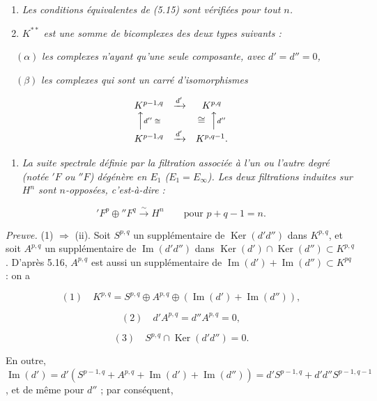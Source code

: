 \documentclass[
  french,
  a3paper,
  a3paper]{extarticle}
\providecommand{\tightlist}{%
  \setlength{\itemsep}{0pt}\setlength{\parskip}{0pt}}
\begin{document}
\begin{enumerate}
\def\labelenumi{(\roman{enumi})}
\item
  \emph{Les conditions équivalentes de (5.15) sont vérifiées pour tout
  \(n\).}
\item
  \emph{\(K^{**}\) est une somme de bicomplexes des deux types suivants
  :}
\end{enumerate}

\(\quad(\alpha)\) \emph{les complexes n'ayant qu'une seule composante,
avec \(d'=d''=0\),}

\(\quad(\beta)\) \emph{les complexes qui sont un carré d'isomorphismes}

\[\begin{array}{ccc}K^{p-1,q}&\xrightarrow{d'}&K^{p,q}\\\Big\uparrow\scriptstyle{d''}\;\cong&&\cong\;\Big\uparrow\scriptstyle{d''}\\K^{p-1,q}&\xrightarrow{d'}&K^{p,q-1}.\end{array}\]

\begin{enumerate}
\def\labelenumi{(\roman{enumi})}
\setcounter{enumi}{2}
\tightlist
\item
  \emph{La suite spectrale définie par la filtration associée à l'un ou
  l'autre degré (notée \({}'F\) ou \({}''F\)) dégénère en \(E_1\)
  (\(E_1=E_\infty\)). Les deux filtrations induites sur \(H^n\) sont
  \(n\)-opposées, c'est-à-dire :}
\end{enumerate}

\[{}'F^p\oplus{}''F^q\xrightarrow{\sim}H^n\qquad\text{pour }p+q-1=n.\]

\emph{Preuve.} (1) \(\Rightarrow\) (ii). Soit \(S^{p,q}\) un
supplémentaire de \(\operatorname{Ker}(d'd'')\) dans \(K^{p,q}\), et
soit \(A^{p,q}\) un supplémentaire de \(\operatorname{Im}(d'd'')\) dans
\(\operatorname{Ker}(d')\cap\operatorname{Ker}(d'')\subset K^{p,q}\).
D'après 5.16, \(A^{p,q}\) est aussi un supplémentaire de
\(\operatorname{Im}(d')+\operatorname{Im}(d'')\subset K^{pq}\) : on a

\[(1)\quad K^{p,q}=S^{p,q}\oplus A^{p,q}\oplus(\operatorname{Im}(d')+\operatorname{Im}(d'')),\]

\[(2)\quad d'A^{p,q}=d''A^{p,q}=0,\]

\[(3)\quad S^{p,q}\cap\operatorname{Ker}(d'd'')=0.\]

En outre,
\(\operatorname{Im}(d')=d'(S^{p-1,q}+A^{p,q}+\operatorname{Im}(d')+\operatorname{Im}(d''))=d'S^{p-1,q}+d'd''S^{p-1,q-1}\),
et de même pour \(d''\) ; par conséquent,
\end{document}
